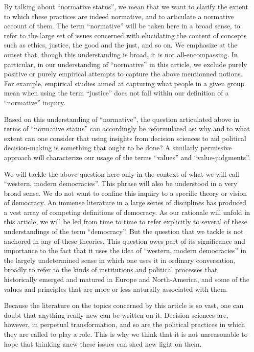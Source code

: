 \documentclass[preprint,11pt]{elsarticle}
\begin{document}
By talking about ``normative status'', we mean that we want to clarify the extent to which these practices are indeed normative, and to articulate a normative account of them. The term ``normative'' will be taken here in a broad sense, to refer to the large set of issues concerned with elucidating the content of concepts such as ethics, justice, the good and the just, and so on. We emphasize at the outset that, though this understanding is broad, it is not all-encompassing. In particular, in our understanding of ``normative'' in this article, we exclude purely positive or purely empirical attempts to capture the above mentionned notions. For example, empirical studies aimed at capturing what people in a given group mean when using the term ``justice'' does not fall within our definition of a ``normative'' inquiry.

Based on this understanding of ``normative'', the question articulated above in terms of ``normative status'' can accordingly be reformulated as: why and to what extent can one consider that using insights from decision sciences to aid political decision-making is something that ought to be done? A similarly permissive approach will characterize our usage of the terms ``values'' and ``value-judgments''.

We will tackle the above question here only in the context of what we will call ``western, modern democracies''. This phrase will also be understood in a very broad sense. We do not want to confine this inquiry to a specific theory or vision of democracy. An immense literature in a large series of disciplines has produced a vest array of competing definitions of democracy. As our rationale will unfold in this article, we will be led from time to time to refer explicitly to several of these understandings of the term ``democracy''. But the question that we tackle is not anchored in any of these theories. This question owes part of its significance and importance to the fact that it uses the idea of “western, modern democracies” in the largely undetermined sense in which one uses it in ordinary conversation, broadly to refer to the kinds of institutions and political processes that historically emerged and matured in Europe and North-America, and some of the values and principles that are more or less naturally associated with them.

Because the literature on the topics concerned by this article is so vast, one can doubt that anything really new can be written on it. Decision sciences are, however, in perpetual transformation, and so are the political practices in which they are called to play a role. This is why we think that it is not unreasonable to hope that thinking anew these issues can shed new light on them.
\end{document}
